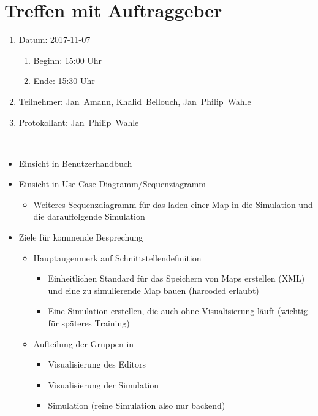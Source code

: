 \pagebreak
\section[Treffen mit Auftraggeber - 2017-11-07]{Treffen mit Auftraggeber}

\begin{enumerate}
	\item Datum: 2017-11-07
	\begin{enumerate}[label*=\arabic*.]
		\item Beginn: 15:00 Uhr
		\item Ende: 15:30 Uhr
	\end{enumerate}
	
	\item Teilnehmer:
	\subitem Jan~Amann, Khalid~Bellouch, Jan~Philip~Wahle
	
	\item Protokollant: Jan~Philip~Wahle
\end{enumerate}
\ \\

\begin{itemize}
	\item Einsicht in Benutzerhandbuch
	\item Einsicht in Use-Case-Diagramm/Sequenziagramm
	\begin{itemize}
		\item Weiteres Sequenzdiagramm für das laden einer Map in die Simulation und die darauffolgende Simulation
	\end{itemize}
	\item Ziele für kommende Besprechung
	\begin{itemize}
		\item Hauptaugenmerk auf Schnittstellendefinition
		\begin{itemize}
			\item Einheitlichen Standard für das Speichern von Maps erstellen (XML) und eine zu simulierende Map bauen (harcoded erlaubt)
			\item Eine Simulation erstellen, die auch ohne Visualisierung läuft (wichtig für späteres Training)
		\end{itemize}
		\item Aufteilung der Gruppen in
		\begin{itemize}
			\item Visualisierung des Editors
			\item Visualisierung der Simulation
			\item Simulation (reine Simulation also nur backend)
		\end{itemize}
	\end{itemize}
\end{itemize}